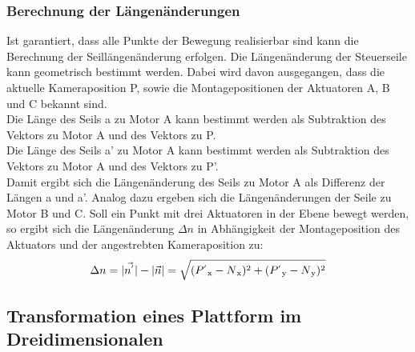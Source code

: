 \documentclass[a4paper, 12pt]{article}
\begin{document}
	\subsubsection{Berechnung der Längenänderungen}
	Ist garantiert, dass alle Punkte der Bewegung realisierbar sind kann die Berechnung der Seillängenänderung erfolgen. 
	Die Längenänderung der Steuerseile kann geometrisch bestimmt werden.
	Dabei wird davon ausgegangen, dass die aktuelle Kameraposition P, sowie die Montagepositionen der Aktuatoren A, B und C bekannt sind.\\
	Die Länge des Seils a zu Motor A kann bestimmt werden als Subtraktion des Vektors zu Motor A und des Vektors zu P.\\
	Die Länge des Seils a' zu Motor A kann bestimmt werden als Subtraktion des Vektors zu Motor A und des Vektors zu P'.\\
	Damit ergibt sich die Längenänderung des Seils zu Motor A als Differenz der Längen a und a'.
	Analog dazu ergeben sich die Längenänderungen der Seile zu Motor B und C.
	Soll ein Punkt mit drei Aktuatoren in der Ebene bewegt werden,
	so ergibt sich die Längenänderung $\Delta n$ in Abhängigkeit der Montageposition des Aktuators und der angestrebten Kameraposition zu:
	\begin{align}
	\Delta n =
	|\vec{n^{'}}|-|\vec{n}|=
	\sqrt{
		(P^{'}\textsubscript{x}-N\textsubscript{x})^2+
		(P^{'}\textsubscript{y}-N\textsubscript{y})^2
	}
	\end{align}
	\subsection{Transformation eines Plattform im Dreidimensionalen}	
\end{document}
